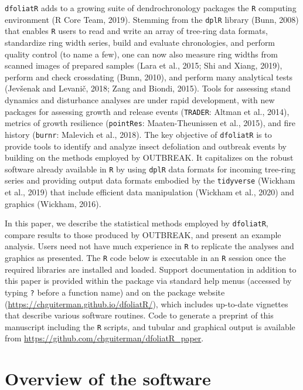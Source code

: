 \documentclass[review]{elsarticle} %
\begin{document}
\texttt{dfoliatR} adds to a growing suite of dendrochronology packages the \texttt{R} computing environment (R Core Team, 2019). Stemming from the \texttt{dplR} library (Bunn, 2008) that enables \texttt{R} users to read and write an array of tree-ring data formats, standardize ring width series, build and evaluate chronologies, and perform quality control (to name a few), one can now also measure ring widths from scanned images of prepared samples (Lara et al., 2015; Shi and Xiang, 2019), perform and check crossdating (Bunn, 2010), and perform many analytical tests (Jevšenak and Levanič, 2018; Zang and Biondi, 2015). Tools for assessing stand dynamics and disturbance analyses are under rapid development, with new packages for assessing growth and release events (\texttt{TRADER}: Altman et al., 2014), metrics of growth resilience (\texttt{pointRes}: Maaten-Theunissen et al., 2015), and fire history (\texttt{burnr}: Malevich et al., 2018). The key objective of \texttt{dfoliatR} is to provide tools to identify and analyze insect defoliation and outbreak events by building on the methods employed by OUTBREAK. It capitalizes on the robust software already available in \texttt{R} by using \texttt{dplR} data formats for incoming tree-ring series and providing output data formats embodied by the \texttt{tidyverse} (Wickham et al., 2019) that include efficient data manipulation (Wickham et al., 2020) and graphics (Wickham, 2016).

In this paper, we describe the statistical methods employed by \texttt{dfoliatR}, compare results to those produced by OUTBREAK, and present an example analysis. Users need not have much experience in \texttt{R} to replicate the analyses and graphics as presented. The \texttt{R} code below is executable in an \texttt{R} session once the required libraries are installed and loaded. Support documentation in addition to this paper is provided within the package via standard help menus (accessed by typing \texttt{?} before a function name) and on the package website (\url{https://chguiterman.github.io/dfoliatR/}), which includes up-to-date vignettes that describe various software routines. Code to generate a preprint of this manuscript including the \texttt{R} scripts, and tubular and graphical output is available from \url{https://github.com/chguiterman/dfoliatR_paper}.

\hypertarget{overview-of-the-software}{%
\section{Overview of the software}\label{overview-of-the-software}}
\end{document}
